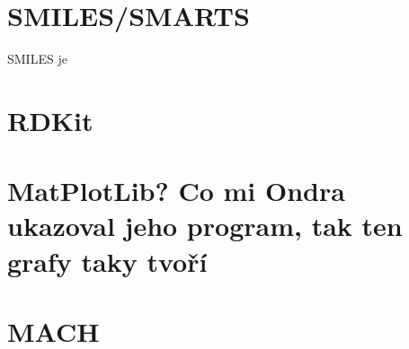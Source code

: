 \section{SMILES/SMARTS}
SMILES je 
\section{RDKit}
\section{MatPlotLib? Co mi Ondra ukazoval jeho program, tak ten grafy taky tvoří}
\section{MACH}

